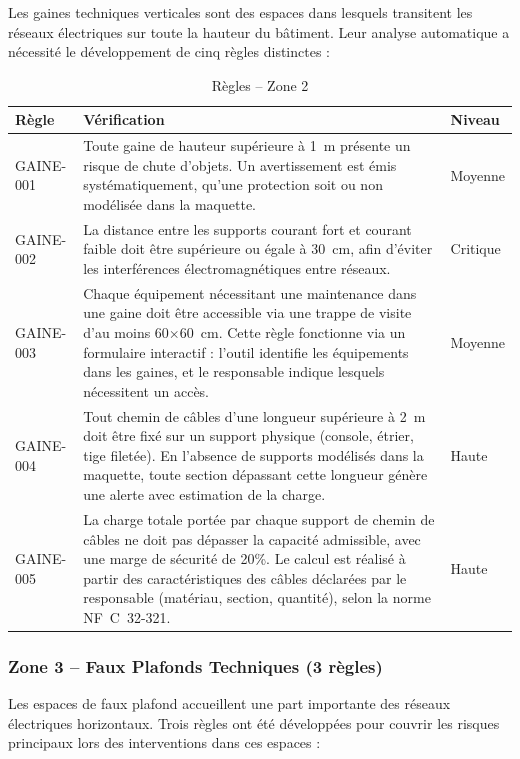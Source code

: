 \documentclass[a4paper,12pt]{article}
\begin{document}
Les gaines techniques verticales sont des espaces dans lesquels transitent les réseaux électriques sur toute la hauteur du bâtiment. Leur analyse automatique a nécessité le développement de cinq règles distinctes :

\begin{table}[h!]
\centering
\begin{tabular}{p{1.8cm}p{9.5cm}p{2cm}}
\toprule
\textbf{Règle} & \textbf{Vérification} & \textbf{Niveau} \\
\midrule
GAINE-001 & Toute gaine de hauteur supérieure à 1~m présente un risque de chute d'objets. Un avertissement est émis systématiquement, qu'une protection soit ou non modélisée dans la maquette. & Moyenne \\[0.5em]
GAINE-002 & La distance entre les supports courant fort et courant faible doit être supérieure ou égale à 30~cm, afin d'éviter les interférences électromagnétiques entre réseaux. & Critique \\[0.5em]
GAINE-003 & Chaque équipement nécessitant une maintenance dans une gaine doit être accessible via une trappe de visite d'au moins 60$\times$60~cm. Cette règle fonctionne via un formulaire interactif : l'outil identifie les équipements dans les gaines, et le responsable indique lesquels nécessitent un accès. & Moyenne \\[0.5em]
GAINE-004 & Tout chemin de câbles d'une longueur supérieure à 2~m doit être fixé sur un support physique (console, étrier, tige filetée). En l'absence de supports modélisés dans la maquette, toute section dépassant cette longueur génère une alerte avec estimation de la charge. & Haute \\[0.5em]
GAINE-005 & La charge totale portée par chaque support de chemin de câbles ne doit pas dépasser la capacité admissible, avec une marge de sécurité de 20\%. Le calcul est réalisé à partir des caractéristiques des câbles déclarées par le responsable (matériau, section, quantité), selon la norme NF~C~32-321. & Haute \\
\bottomrule
\end{tabular}
\caption{Règles -- Zone 2}
\end{table}

\subsubsection*{Zone 3 -- Faux Plafonds Techniques (3 règles)}

Les espaces de faux plafond accueillent une part importante des réseaux électriques horizontaux. Trois règles ont été développées pour couvrir les risques principaux lors des interventions dans ces espaces :
\end{document}
